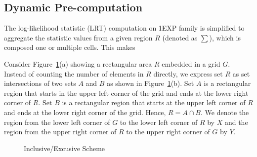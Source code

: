 \documentclass[10pt,journal,cspaper,compsoc]{IEEEtran}
\begin{document}
\subsection{Dynamic Pre-computation}
\label{sec:mov2}
The log-likelihood statistic (LRT) computation on 1EXP family is simplified to aggregate the statistic values from a given region $R$ (denoted as $\sum $), which is composed one or multiple cells. This makes

Consider Figure~\ref{fig:example}(a) showing a rectangular area $R$ embedded in a grid $G$. Instead of counting the number of elements in $R$ directly, we express set $R$ as set intersections of two sets $A$ and $B$ as shown in Figure~\ref{fig:example}(b). Set $A$ is a rectangular region that starts in the upper left corner of the grid and ends at the lower right corner of $R$. Set $B$ is a rectangular region that starts at the upper left corner of $R$ and ends at the lower right corner of the grid. Hence, $R=A \cap B$. We denote the region from the lower left corner of $G$ to the lower left corner of $R$ by $X$ and the region from the upper right corner of $R$ to the upper right corner of $G$ by $Y$.

\begin{figure}[h]
     \begin{center}
\end{center}
\vspace{-10pt}
\caption{Inclusive/Excusive Scheme}\label{fig:example}
\end{figure}
\end{document}

